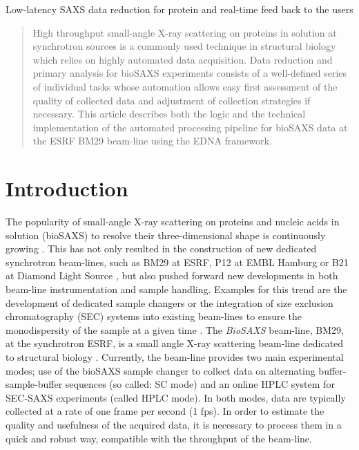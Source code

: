 \documentclass[preprint,pdf]{iucr}              %
\begin{document}

\maketitle                        %

\begin{synopsis}
Low-latency SAXS data reduction for protein and real-time feed back to the users
\end{synopsis}

\begin{abstract}
High throughput small-angle X-ray scattering on proteins in solution at
synchrotron sources is a commonly used technique in structural biology which
relies on highly automated data acquisition.
Data reduction and primary analysis for bioSAXS experiments consists of a
well-defined series of individual tasks whose automation allows easy first
assessment of the quality of collected data and adjustment of collection strategies if necessary.
This article describes both the logic and the technical implementation of the
automated processing pipeline for bioSAXS data at the ESRF BM29 beam-line using
the EDNA framework.
\end{abstract}


\section{Introduction}
The popularity of small-angle X-ray scattering on proteins and nucleic acids in
solution (bioSAXS) to resolve their three-dimensional shape is continuously
growing \cite{Graewert2013,Hura2009,Reyes2014}.
This has not only resulted in the construction of new dedicated
synchrotron beam-lines, such as BM29 at ESRF, P12 at EMBL Hamburg or B21 at
Diamond Light Source \cite{BM29paper,P12,B21}, but also pushed forward new
developments in both beam-line instrumentation and sample handling.
Examples for this trend are the development of dedicated sample changers
\cite{SCPaper} or the integration of size exclusion chromatography (SEC) systems
into existing beam-lines to ensure the monodispersity of the sample at a given
time \cite{SECPaper2012,SECP12,SECSWING}.
The \textit{BioSAXS} beam-line, BM29, at the synchrotron ESRF, is a small angle
X-ray scattering beam-line dedicated to structural biology \cite{BM29paper}.
Currently, the beam-line provides two main experimental modes; use of the
bioSAXS sample changer \cite{SCPaper} to collect data on alternating
buffer-sample-buffer sequences (so called: SC mode) and an online HPLC system
\cite{SECPaper2012} for SEC-SAXS experiments (called HPLC mode).
In both modes, data are typically collected at a rate of one frame per second
(1 fps).
In order to estimate the quality and usefulness of the acquired data, it is
necessary to process them in a quick and robust way, compatible with the
throughput of the beam-line.
\end{document}
